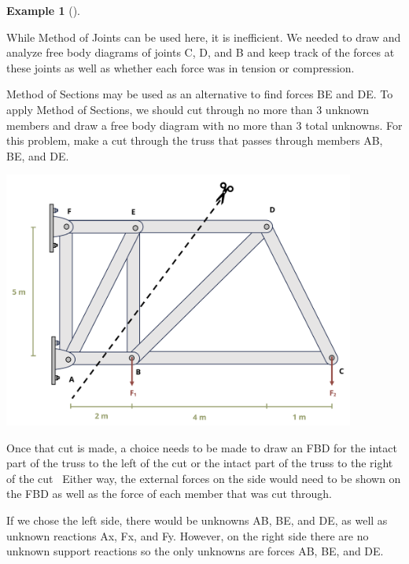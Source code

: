 \documentclass[
  letterpaper,
  DIV=11,
  numbers=noendperiod]{scrreprt}
\theoremstyle{definition}
\newtheorem{example}{Example}[chapter]
\theoremstyle{remark}
\begin{document}
\begin{tcolorbox}
\begin{example}[]
\begin{tcolorbox}
While Method of Joints can be used here, it is inefficient. We needed to
draw and analyze free body diagrams of joints C, D, and B and keep track
of the forces at these joints as well as whether each force was in
tension or compression.

Method of Sections may be used as an alternative to find forces BE and
DE. To apply Method of Sections, we should cut through no more than 3
unknown members and draw a free body diagram with no more than 3 total
unknowns. For this problem, make a cut through the truss that passes
through members AB, BE, and DE.

\begin{center}
\includegraphics[width=4.55208in,height=\textheight]{images/Updated CH1 examples/example 1.4 part 5.png}
\end{center}

Once that cut is made, a choice needs to be made to draw an FBD for the
intact part of the truss to the left of the cut or the intact part of
the truss to the right of the cut~ Either way, the external forces on
the side would need to be shown on the FBD as well as the force of each
member that was cut through.

If we chose the left side, there would be unknowns AB, BE, and DE, as
well as unknown reactions Ax, Fx, and Fy. However, on the right side
there are no unknown support reactions so the only unknowns are forces
AB, BE, and DE.


\end{tcolorbox}
\end{example}
\end{tcolorbox}
\end{document}
